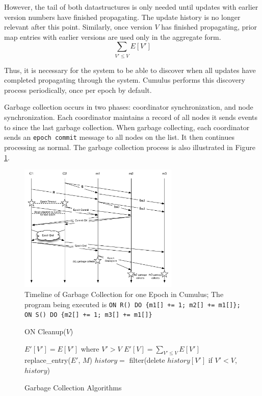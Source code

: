 \documentclass{vldb}
\begin{document}
However, the tail of both datastructures is only needed until updates with earlier version numbers have finished propagating.  The update history is no longer relevant after this point.  Similarly, once version $V$ has finished propagating, prior map entries with earlier versions are used only in the aggregate form.
$$\sum_{V' \leq V} E[V']$$

Thus, it is necessary for the system to be able to discover when all updates have completed propagating through the system.  Cumulus performs this discovery process periodically, once per epoch by default.  


Garbage collection occurs in two phases: coordinator synchronization, and node synchronization.  Each coordinator maintains a record of all nodes it sends events to since the last garbage collection.  When garbage collecting, each coordinator sends an \texttt{epoch commit} message to all nodes on the list.  It then continues processing as normal.  The garbage collection process is also illustrated in Figure \ref{fig:GCflowchart}.

\begin{figure}
\begin{center}
\includegraphics[width=3in]{graphics/GCflowchart}
\caption{Timeline of Garbage Collection for one Epoch in Cumulus; The program being executed is \texttt{ON R() DO \{m1[] += 1; m2[] += m1[]\}; ON S() DO \{m2[] += 1; m3[] += m1[]\}} }
\label{fig:GCflowchart}
\end{center}

\end{figure}

\begin{figure}
ON Cleanup($V$)
\begin{algorithmic}[1]
    \STATE $E'[V'] = E[V']$ where $V' > V$
    \STATE $E'[V] = \sum_{V' \leq V} E[V']$
    \STATE replace\_entry($E'$, $M$)
  \ENDFOR
\ENDFOR
\STATE $history =$ filter(delete $history[V']$ if $V' < V$, $history$)
\end{algorithmic}
\caption{Garbage Collection Algorithms}
\label{fig:gcalgorithms}
\end{figure}
\end{document}
